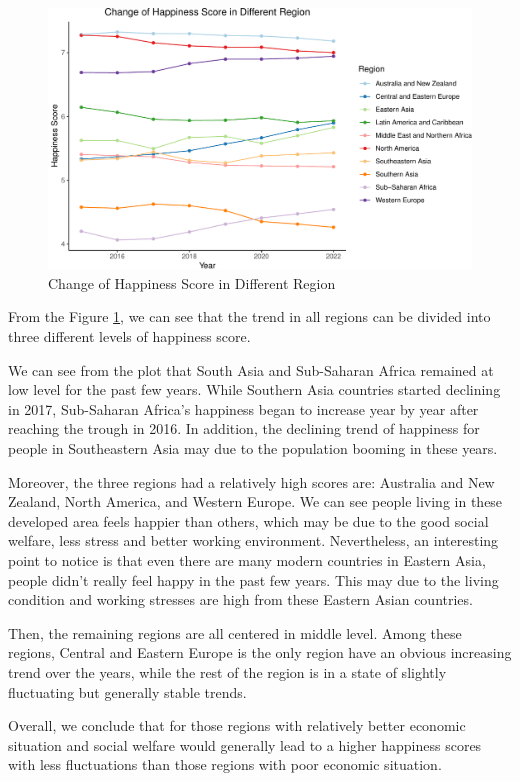 \documentclass[11pt,a4paper,]{article}
\begin{document}
\begin{figure}
\centering
\includegraphics{Assignment4_files/figure-latex/trends-1.pdf}
\caption{\label{fig:trends}Change of Happiness Score in Different Region}
\end{figure}

From the Figure \ref{fig:trends}, we can see that the trend in all regions can be divided into three different levels of happiness score.

We can see from the plot that South Asia and Sub-Saharan Africa remained at low level for the past few years. While Southern Asia countries started declining in 2017, Sub-Saharan Africa's happiness began to increase year by year after reaching the trough in 2016. In addition, the declining trend of happiness for people in Southeastern Asia may due to the population booming in these years.

Moreover, the three regions had a relatively high scores are: Australia and New Zealand, North America, and Western Europe. We can see people living in these developed area feels happier than others, which may be due to the good social welfare, less stress and better working environment. Nevertheless, an interesting point to notice is that even there are many modern countries in Eastern Asia, people didn't really feel happy in the past few years. This may due to the living condition and working stresses are high from these Eastern Asian countries.

Then, the remaining regions are all centered in middle level. Among these regions, Central and Eastern Europe is the only region have an obvious increasing trend over the years, while the rest of the region is in a state of slightly fluctuating but generally stable trends.

Overall, we conclude that for those regions with relatively better economic situation and social welfare would generally lead to a higher happiness scores with less fluctuations than those regions with poor economic situation.
\end{document}
